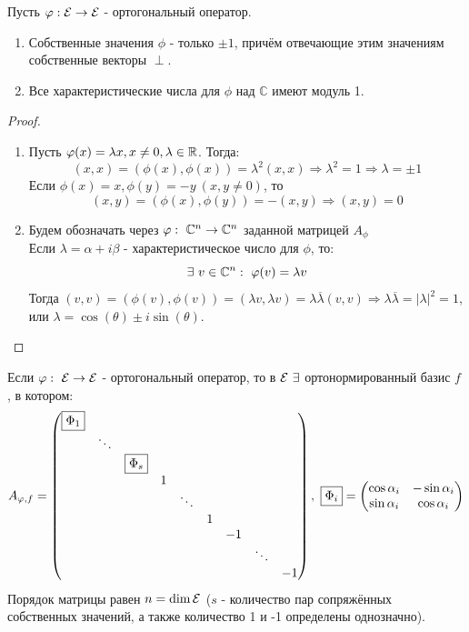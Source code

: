 \begin{theorem}
    Пусть $\varphi: \mathcal{E} \rightarrow \mathcal{E}$ - ортогональный оператор.
    \begin{enumerate}
        \item Собственные значения $\phi$ - только $\pm 1$, причём отвечающие этим значениям собственные векторы $\perp$.
        \item Все характеристические числа для $\phi$ над $\mathbb{C}$ имеют модуль 1. 
    \end{enumerate}
\end{theorem}
\begin{proof}\tab
    \begin{enumerate}
        \item Пусть $\varphi(x) = \lambda x, x \neq 0, \lambda \in \mathbb{R}$. Тогда:
        $$(x, x) = (\phi(x), \phi(x)) = \lambda^2(x,x) \Longrightarrow \lambda^2 = 1 \Longrightarrow \lambda = \pm 1$$ 
        Если $\phi(x) = x, \phi(y) = -y \ (x,y \neq 0)$, то
        $$(x, y) = (\phi(x), \phi(y)) = -(x, y) \Longrightarrow (x, y) = 0$$
        \item Будем обозначать через $\varphi: \ \mathbb{C}^n \to \mathbb{C}^n$ заданной матрицей $A_\phi$ \\
        Если $\lambda = \alpha + i\beta$ - характеристическое число для $\phi$, то: 
        $$\exists \ v \in \mathbb{C}^n: \ \varphi(v) = \lambda v$$
        Тогда $(v, v) = (\phi(v), \phi(v)) = (\lambda v, \lambda v) = \lambda \overline{\lambda}(v,v) \Longrightarrow \lambda \overline{\lambda} = |\lambda|^2 = 1$, или $\lambda = \cos(\theta) \pm i \sin(\theta)$.
    \end{enumerate}
\end{proof}
\begin{theorem}
    Если $\varphi: \ \mathcal{E} \to \mathcal{E}$ - ортогональный оператор, то в $\E \ \exists$ ортонормированный базис $f$ , в котором:
    $$A_{\phi,f} = \begin{pmatrix}
        \text{\fbox{$\Phi_1$}}\\
        \null & \ddots\\
        \null & \null & \text{\fbox{$\Phi_s$}}\\
        \null & \null & \null & 1\\
        \null & \null & \null & \null & \ddots \\
        \null & \null & \null & \null & \null & 1\\
        \null & \null & \null & \null & \null & \null & -1 \\
        \null & \null & \null & \null & \null & \null & \null & \ddots \\
        \null & \null & \null & \null & \null & \null & \null & \null & -1
    \end{pmatrix}, \ \text{\fbox{$\Phi_i$}} = \begin{pmatrix}
        \cos \alpha_i & -\sin \alpha_i \\ \sin \alpha_i & \cos \alpha_i
    \end{pmatrix}$$   
    Порядок матрицы равен $ n = \dim \mathcal{E}$ ($s$ - количество пар сопряжённых собственных значений, а также количество 1 и -1 определены однозначно). 
\end{theorem} 
